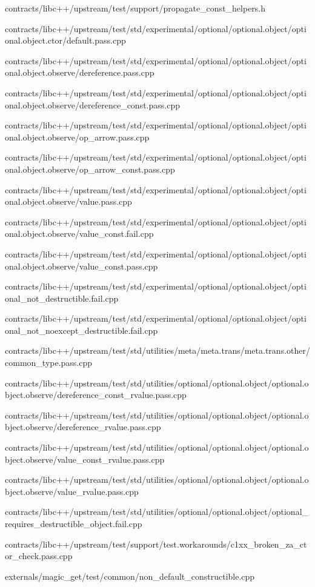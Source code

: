 \begin{DoxyCompactItemize}
contracts/libc++/upstream/test/support/propagate\+\_\+const\+\_\+helpers.\+h\item 
contracts/libc++/upstream/test/std/experimental/optional/optional.\+object/optional.\+object.\+ctor/default.\+pass.\+cpp\item 
contracts/libc++/upstream/test/std/experimental/optional/optional.\+object/optional.\+object.\+observe/dereference.\+pass.\+cpp\item 
contracts/libc++/upstream/test/std/experimental/optional/optional.\+object/optional.\+object.\+observe/dereference\+\_\+const.\+pass.\+cpp\item 
contracts/libc++/upstream/test/std/experimental/optional/optional.\+object/optional.\+object.\+observe/op\+\_\+arrow.\+pass.\+cpp\item 
contracts/libc++/upstream/test/std/experimental/optional/optional.\+object/optional.\+object.\+observe/op\+\_\+arrow\+\_\+const.\+pass.\+cpp\item 
contracts/libc++/upstream/test/std/experimental/optional/optional.\+object/optional.\+object.\+observe/value.\+pass.\+cpp\item 
contracts/libc++/upstream/test/std/experimental/optional/optional.\+object/optional.\+object.\+observe/value\+\_\+const.\+fail.\+cpp\item 
contracts/libc++/upstream/test/std/experimental/optional/optional.\+object/optional.\+object.\+observe/value\+\_\+const.\+pass.\+cpp\item 
contracts/libc++/upstream/test/std/experimental/optional/optional.\+object/optional\+\_\+not\+\_\+destructible.\+fail.\+cpp\item 
contracts/libc++/upstream/test/std/experimental/optional/optional.\+object/optional\+\_\+not\+\_\+noexcept\+\_\+destructible.\+fail.\+cpp\item 
contracts/libc++/upstream/test/std/utilities/meta/meta.\+trans/meta.\+trans.\+other/common\+\_\+type.\+pass.\+cpp\item 
contracts/libc++/upstream/test/std/utilities/optional/optional.\+object/optional.\+object.\+observe/dereference\+\_\+const\+\_\+rvalue.\+pass.\+cpp\item 
contracts/libc++/upstream/test/std/utilities/optional/optional.\+object/optional.\+object.\+observe/dereference\+\_\+rvalue.\+pass.\+cpp\item 
contracts/libc++/upstream/test/std/utilities/optional/optional.\+object/optional.\+object.\+observe/value\+\_\+const\+\_\+rvalue.\+pass.\+cpp\item 
contracts/libc++/upstream/test/std/utilities/optional/optional.\+object/optional.\+object.\+observe/value\+\_\+rvalue.\+pass.\+cpp\item 
contracts/libc++/upstream/test/std/utilities/optional/optional.\+object/optional\+\_\+requires\+\_\+destructible\+\_\+object.\+fail.\+cpp\item 
contracts/libc++/upstream/test/support/test.\+workarounds/c1xx\+\_\+broken\+\_\+za\+\_\+ctor\+\_\+check.\+pass.\+cpp\item 
externals/magic\+\_\+get/test/common/non\+\_\+default\+\_\+constructible.\+cpp\end{DoxyCompactItemize}
